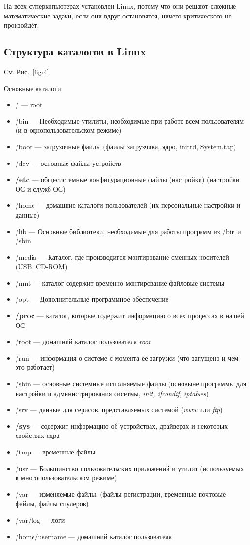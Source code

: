 \documentclass[oneside, final, 14pt]{extreport} %
\begin{document}
На всех суперкопьютерах установлен Linux, потому что они решают сложные математические
задачи, если они вдруг остановятся, ничего критического не произойдёт.






\subsection{Структура каталогов в Linux}

См. Рис.~\ref{fig:4}

Основные каталоги
\begin{itemize}
    \item / --- root
    \item /bin --- Необходимые утилиты, необходимые при работе всем пользователям (и в однопользовательском режиме)
    \item /boot --- загрузочные файлы (файлы загрузчика, ядро, initrd, System.tap)
    \item /dev --- основные файлы устройств
    \item \textbf{/etc} --- общесистемные конфигурационные файлы (настройки) (настройки ОС и служб ОС)
    \item /home --- домашние каталоги пользователей (их персональные настройки и данные)
    \item /lib --- Основные библиотеки, необходимые для работы программ из /bin и /sbin 
    \item /media --- Каталог, где производится монтирование сменных носителей (USB, CD-ROM)
    \item /mnt --- каталог содержит временно монтирование файловые системы 
    \item /opt --- Дополнительные программное обеспечение 
    \item \textbf{/proc} --- каталог, которые содержит информацию о всех процессах в нашей ОС
    \item /root --- домашний каталог пользователя \textit{root}
    \item /run --- информация о системе с момента её загрузки (что запущено и чем это работает)
    \item /sbin --- основные системные исполняемые файлы (основыне программы для настройки и администрирования сисетмы, \textit{init, ifcondif, iptables})
    \item /srv --- данные для серисов, представляемых системой (\textit{www} или \textit{ftp})
    \item \textbf{/sys} --- содержит информацию об устройствах, драйверах и некоторых свойствах ядра
    \item /tmp --- временные файлы
    \item /usr --- Большинство пользовательских приложений и утилит (используемых в многопользовательском режиме)
    \item /var --- изменяемые файлы. (файлы регистрации, временные почтовые файлы, файлы спулеров)
    \item /var/log --- логи
    \item /home/username --- домашний каталог пользователя 
\end{itemize}
\end{document}
